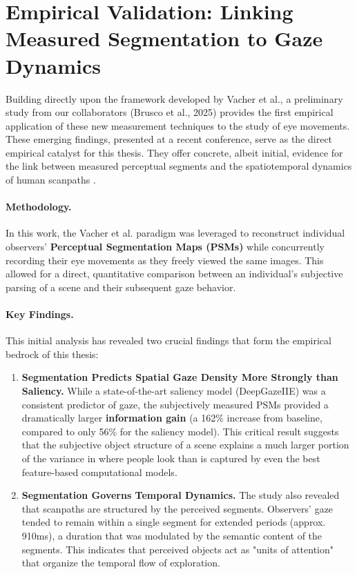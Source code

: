 \section[Linking Measured Segmentation to Gaze Dynamics]{Empirical Validation: Linking Measured Segmentation to Gaze Dynamics}
\label{sec:sota_brusco_evidence}
Building directly upon the framework developed by Vacher et al., a preliminary study from our collaborators (Brusco et al., 2025) provides the first empirical application of these new measurement techniques to the study of eye movements. These emerging findings, presented at a recent conference, serve as the direct empirical catalyst for this thesis. They offer concrete, albeit initial, evidence for the link between measured perceptual segments and the spatiotemporal dynamics of human scanpaths \cite{Brusco2025}.
\paragraph{Methodology.} In this work, the Vacher et al. paradigm was leveraged to reconstruct individual observers' \textbf{Perceptual Segmentation Maps (PSMs)} while concurrently recording their eye movements as they freely viewed the same images. This allowed for a direct, quantitative comparison between an individual's subjective parsing of a scene and their subsequent gaze behavior.
\paragraph{Key Findings.} This initial analysis has revealed two crucial findings that form the empirical bedrock of this thesis:
\begin{enumerate}
\item \textbf{Segmentation Predicts Spatial Gaze Density More Strongly than Saliency.} While a state-of-the-art saliency model (DeepGazeIIE) was a consistent predictor of gaze, the subjectively measured PSMs provided a dramatically larger \textbf{information gain} (a 162\% increase from baseline, compared to only 56\% for the saliency model). This critical result suggests that the subjective object structure of a scene explains a much larger portion of the variance in where people look than is captured by even the best feature-based computational models.
\item \textbf{Segmentation Governs Temporal Dynamics.} The study also revealed that scanpaths are structured by the perceived segments. Observers' gaze tended to remain within a single segment for extended periods (approx. 910ms), a duration that was modulated by the semantic content of the segments. This indicates that perceived objects act as "units of attention" that organize the temporal flow of exploration.
\end{enumerate}
